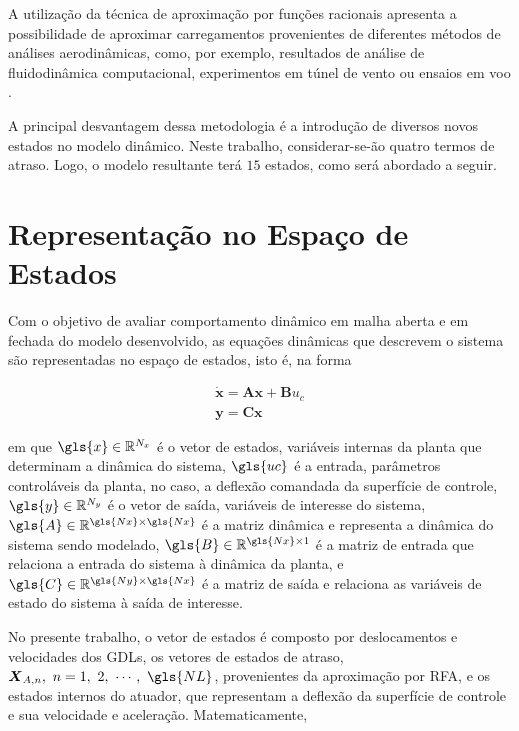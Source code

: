 A utilização da técnica de aproximação por funções racionais apresenta a possibilidade de aproximar carregamentos provenientes de diferentes métodos de análises aerodinâmicas, como, por exemplo, resultados de análise de fluidodinâmica computacional, experimentos em túnel de vento ou ensaios em voo \cite{book:Wright-Cooper}.

A principal desvantagem dessa metodologia é a introdução de diversos novos estados no modelo dinâmico. Neste trabalho, considerar-se-ão quatro termos de atraso. Logo, o modelo resultante terá $15$ estados, como será abordado a seguir.


\section{Representação no Espaço de Estados}\label{sec:espaço-estados}

Com o objetivo de avaliar comportamento dinâmico em malha aberta e em fechada do modelo desenvolvido, as equações dinâmicas que descrevem o sistema são representadas no espaço de estados, isto é, na forma

\begin{equation}\label{eq:espaco-estados-completo}
    \begin{gathered}
        \dot{\boldsymbol{x}} = \boldsymbol{A}\boldsymbol{x} + \boldsymbol{B}u_{c} \\
        \boldsymbol{y} = \boldsymbol{C}\boldsymbol{x}
    \end{gathered}
\end{equation}

\noindent em que $\gls{x} \in \mathbb{R}^{N_x}$ é o vetor de estados, variáveis internas da planta que determinam a dinâmica do sistema, $\gls{uc}$ é a entrada, parâmetros controláveis da planta, no caso, a deflexão comandada da superfície de controle, $\gls{y} \in \mathbb{R}^{N_y}$ é o vetor de saída, variáveis de interesse do sistema, $\gls{A} \in \mathbb{R}^{\gls{Nx} \times \gls{Nx}}$ é a matriz dinâmica e representa a dinâmica do sistema sendo modelado, $\gls{B} \in \mathbb{R}^{\gls{Nx} \times 1}$ é a matriz de entrada que relaciona a entrada do sistema à dinâmica da planta, e $\gls{C} \in \mathbb{R}^{\gls{Ny} \times \gls{Nx}}$ é a matriz de saída e relaciona as variáveis de estado do sistema à saída de interesse.

No presente trabalho, o vetor de estados é composto por deslocamentos e velocidades dos \gls{GDL}s, os vetores de estados de atraso, $\boldsymbol{X}_{A,n}, \ n = 1,\ 2,\ \cdots,\ \gls{NL}$, provenientes da aproximação por \gls{RFA}, e os estados internos do atuador, que representam a deflexão da superfície de controle e sua velocidade e aceleração. Matematicamente,

